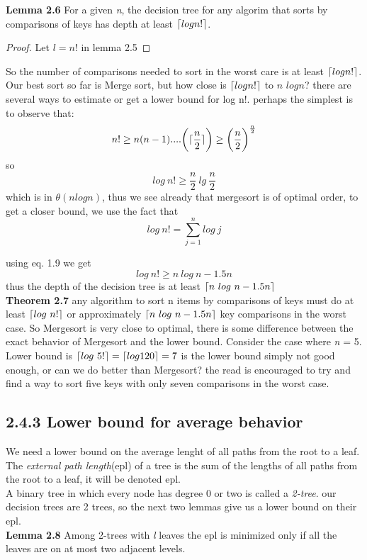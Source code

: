 \documentclass[a4paper,10pt,titlepage]{report}
\DeclarePairedDelimiter{\ceil}{\lceil}{\rceil}
\begin{document}
\vspace{5mm}
\textbf{Lemma 2.6} For a given \textit{n}, the decision tree for any algorim that sorts by comparisons of keys has depth at least $\ceil{log n!}$.
\vspace{5mm}
\begin{proof}
Let $\textit{l} = \textit{n}!$ in lemma 2.5
\end{proof}
\vspace{5mm}
So the number of comparisons needed to sort in the worst care is at least $\ceil{log n!}$. Our best sort so far is Merge sort, but how close is $\ceil{log n!}$ to $\textit{n }log\textit{n}$? there are several ways to estimate or get a lower bound for log n!. perhaps the simplest is to observe that:
\begin{equation}
n! \geq n(n-1)....\bigg(\ceil{\frac{n}{2}}\bigg) \geq \bigg(\frac{n}{2}\bigg)^{\frac{n}{2}}
\end{equation}
so
\begin{equation}
log \ n! \geq \frac{n}{2} \ lg \ \frac{n}{2}
\end{equation}
which is in $\theta(n log n)$, thus we see already that mergesort is of optimal order, to get a closer bound, we use the fact that 
\begin{equation}
log \ n! = \sum_{j=1}^n log \ j
\end{equation}

using eq. 1.9 we get
\begin{equation}
log \ n! \geq n \ log \ n - 1.5n
\end{equation}
thus the depth of the decision tree is at least $\ceil{n \ log \ n - 1.5n}$\\

\vspace{5mm}
\textbf{Theorem 2.7} any algorithm to sort n items by comparisons of keys must do at least $ \ceil{log \ n!}$ or approximately  $\ceil{n \ log \ n - 1.5n}$ key comparisons in the worst case.
\vspace{5mm}
So Mergesort is very close to optimal, there is some difference between the exact behavior of Mergesort and the lower bound. Consider the case where \textit{n} = 5. Lower bound is $\ceil{log \ 5!} = \ceil{log 120} = 7$ is the lower bound simply not good enough, or can we do better than Mergesort? the read is encouraged to try and find a way to sort five keys with only seven comparisons in the worst case.
\subsection{2.4.3 Lower bound for average behavior}
We need a lower bound on the average lenght of all paths from the root to a leaf. The \textit{external path length}(epl) of a tree is the sum of the lengths of all paths from the root to a leaf, it will be denoted epl. \\
A binary tree in which every node has degree 0 or two is called a \textit{2-tree}. our decision trees are 2 trees, so the next two lemmas give us a lower bound on their epl.\\
\vspace{5mm}
\textbf{Lemma 2.8} Among 2-trees with \textit{l} leaves the epl is minimized only if all the leaves are on at most two adjacent levels.
\end{document}
